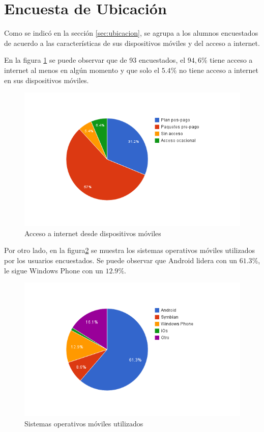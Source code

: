 \section{Encuesta de Ubicación}
\label{sec:res_UBICACION}

Como se indicó en la sección \ref{sec:ubicacion}, se agrupa a los alumnos encuestados
de acuerdo a las características de sus dispositivos móviles y del acceso a internet.

En la figura \ref{fig:ubicacion_acceso_internet} se puede observar que de 93 encuestados, 
el $94,6\%$ tiene acceso a internet al menos en algún momento y que solo el $5.4\%$ no tiene
acceso a internet en sus dispositivos móviles.

\begin{figure}[ht!]
\centering
\includegraphics[scale=0.8]{resultados/imagenes/ubicacion_acceso_internet.png}
\caption{Acceso a internet desde dispositivos móviles}
\label{fig:ubicacion_acceso_internet}
\end{figure}

Por otro lado, en la figura\ref{fig:ubicacion_sistemas_operativos} se muestra los sistemas 
operativos móviles utilizados por los usuarios encuestados. Se puede observar que Android 
lidera con un $61.3\%$, le sigue Windows Phone con un $12.9\%$.

\begin{figure}[ht!]
\centering
\includegraphics[scale=0.8]{resultados/imagenes/ubicacion_sistemas_operativos.png}
\caption{Sistemas operativos móviles utilizados}
\label{fig:ubicacion_sistemas_operativos}
\end{figure}


